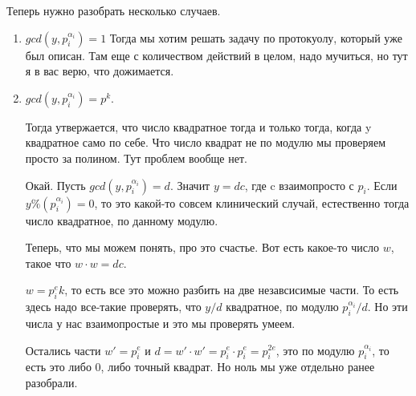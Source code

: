 	Теперь нужно разобрать несколько случаев. 
	\begin{enumerate}
	\item $gcd(y, p_i^{\alpha_i}) = 1$
		Тогда мы хотим решать задачу по протокуолу, который уже был описан. 
		Там еще с количеством действий в целом, надо мучиться, но тут я в вас верю, что дожимается. 
	\item $gcd(y, p_i^{\alpha_i}) = p^{k}$. 

		Тогда утвержается, что число квадратное тогда и только тогда, когда y квадратное 
		само по себе. Что число квадрат не по модулю мы проверяем просто за полином. Тут проблем вообще нет.

		Окай. Пусть $gcd(y, p_i^{\alpha_i}) = d$. Значит $y = dc$, где c взаимопросто с $p_i$. Если
		$y \% (p_i^{\alpha_i}) = 0$, то это какой-то совсем клинический случай, естественно
		тогда число квадратное, по данному модулю.

		Теперь, что мы можем понять, про это счастье. Вот есть какое-то число $w$, такое что $w \cdot w = dc$.

		$w = p_i^{e}k$, то есть все это можно разбить на две незавсисимые части. То есть
		здесь надо все-такие проверять, что $y/d$ квадратное, по модулю $p_i^{\alpha_i}/d$. Но
		эти числа у нас взаимопростые и это мы проверять умеем.

		Остались части $w' = p_i^{e}$ и $d = w' \cdot w' = p_i^{e} \cdot p_i^{e} = p_i^{2e}$, это по
		модулю $p_i^{\alpha_i}$, то есть это либо 0, либо точный квадрат. Но ноль мы уже отдельно ранее разобрали.   
 
	\end{enumerate}